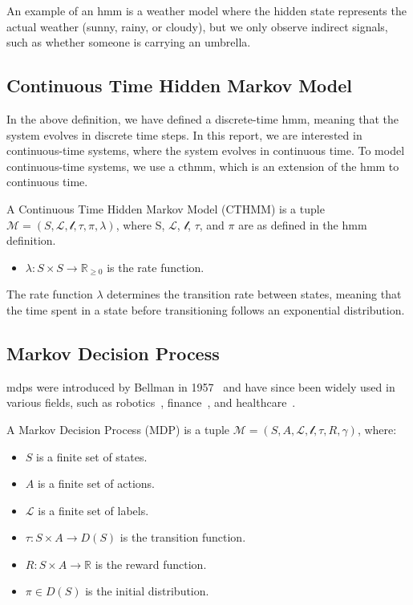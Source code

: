 An example of an \gls{hmm} is a weather model where the hidden state represents the actual weather (sunny, rainy, or cloudy), but we only observe indirect signals, such as whether someone is carrying an umbrella.

\subsection{Continuous Time Hidden Markov Model}\label{subsec:ctmc}
In the above definition, we have defined a discrete-time \gls{hmm}, meaning that the system evolves in discrete time steps.
In this report, we are interested in continuous-time systems, where the system evolves in continuous time.
To model continuous-time systems, we use a \gls{cthmm}, which is an extension of the \gls{hmm} to continuous time.
\begin{definition}
    A Continuous Time Hidden Markov Model (CTHMM) is a tuple $\mathcal{M} = (S, \mathcal{L}, \mathscr{l}, \tau,  \pi, \lambda)$, where S, $\mathcal{L}$, $\mathscr{l}$, $\tau$, and $\pi$ are as defined in the \gls{hmm} definition.
    \begin{itemize}
        \item $\lambda: S \times S \rightarrow \mathbb{R}_{\geq 0}$ is the rate function.
    \end{itemize}
\end{definition}

The rate function $\lambda$ determines the transition rate between states, meaning that the time spent in a state before transitioning follows an exponential distribution.

\subsection{Markov Decision Process}\label{subsec:mdp}
\glspl{mdp} were introduced by Bellman in 1957~\cite{bellman1957} and have since been widely used in various fields, such as robotics~\cite{mdprobotics2020}, finance~\cite{mdpfinance2023}, and healthcare~\cite{mdphealthcare2021}.
\begin{definition}
    A Markov Decision Process (MDP) is a tuple $\mathcal{M} = (S, A, \mathcal{L}, \mathscr{l}, \tau, R, \gamma)$, where:
    \begin{itemize}
        \item $S$ is a finite set of states.
        \item $A$ is a finite set of actions.
        \item $\mathcal{L}$ is a finite set of labels.
        \item $\tau: S \times A \rightarrow D(S)$ is the transition function.
        \item $R: S \times A \rightarrow \mathbb{R}$ is the reward function.
        \item $\pi \in D(S)$ is the initial distribution.
    \end{itemize}
\end{definition}


